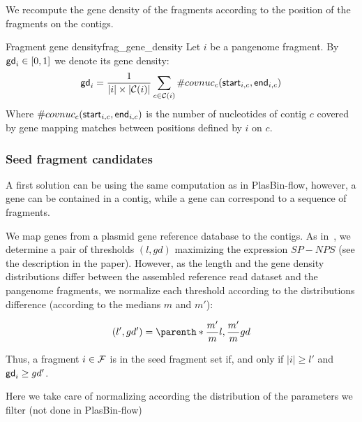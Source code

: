 \begin{newfeatbox}
    We recompute the gene density of the fragments according to the position of the fragments on the contigs.
\end{newfeatbox}

\begin{definition}{Fragment gene density}{frag_gene_density}
    Let \(i\) be a pangenome fragment.
    By \(\mathsf{gd}_{i} \in [0, 1]\) we denote its gene density:
    \[
    \mathsf{gd}_{i} = \frac{1}{ |i| \times |\mathcal{C}{}(i)| } \sum_{\substack{
        c \in \mathcal{C}{}(i) \\
    }} \#covnuc_{c}(\mathsf{start}_{i, c}, \mathsf{end}_{i, c})
    \]
    Where \(\#covnuc_{c}(\mathsf{start}_{i, c}, \mathsf{end}_{i, c})\) is the number of nucleotides of contig \(c\) covered by gene mapping matches between positions defined by \(i\) on \(c\).
\end{definition}


\subsubsection{Seed fragment candidates}


\begin{notebox}
    A first solution can be using the same computation as in PlasBin-flow, however, a gene can be contained in a contig, while a gene can correspond to a sequence of fragments.    
\end{notebox}

We map genes from a plasmid gene reference database to the contigs.
As in~\cite{manePlasBinflowFlowbasedMILP2023}, we determine a pair of thresholds \((l, gd)\) maximizing the expression \(SP - NPS\) (see the description in the paper).
However, as the length and the gene density distributions differ between the assembled reference read dataset and the pangenome fragments, we normalize each threshold according to the distributions difference (according to the medians \(m\) and \(m'\)):

\[
(l', gd') = \parenth*{\frac{m'}{m} l, \frac{m'}{m} gd}
\]

Thus, a fragment \(i \in \mathcal{F}{}\) is in the seed fragment set \SeedFrags{} if, and only if \(|i| \geq l'\) and \(\mathsf{gd}_{i} \geq gd'\).

\begin{newfeatbox}
    Here we take care of normalizing according the distribution of the parameters we filter (not done in PlasBin-flow)
\end{newfeatbox}

